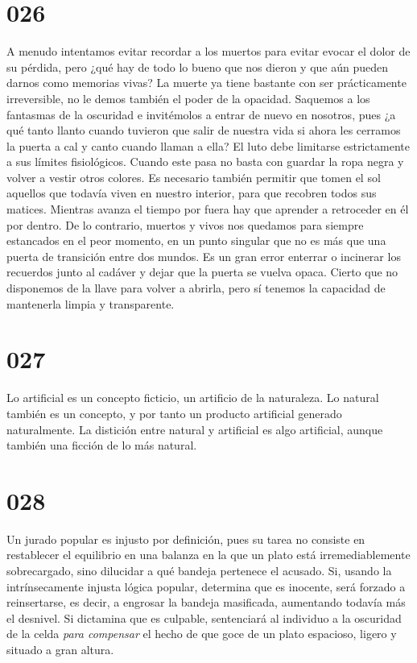 \documentclass[a4paper,11pt,openright,twocolumn]{book}
\begin{document}
\section*{026}

A menudo intentamos evitar recordar a los muertos para evitar evocar el dolor de su pérdida, pero ¿qué hay de todo lo bueno que nos dieron y que aún pueden darnos como memorias vivas? La muerte ya tiene bastante con ser prácticamente irreversible, no le demos también el poder de la opacidad. Saquemos a los fantasmas de la oscuridad e invitémolos a entrar de nuevo en nosotros, pues ¿a qué tanto llanto cuando tuvieron que salir de nuestra vida si ahora les cerramos la puerta a cal y canto cuando llaman a ella? El luto debe limitarse estrictamente a sus límites fisiológicos. Cuando este pasa no basta con guardar la ropa negra y volver a vestir otros colores. Es necesario también permitir que tomen el sol aquellos que todavía viven en nuestro interior, para que recobren todos sus matices. Mientras avanza el tiempo por fuera hay que aprender a retroceder en él por dentro. De lo contrario, muertos y vivos nos quedamos para siempre estancados en el peor momento, en un punto singular que no es más que una puerta de transición entre dos mundos. Es un gran error enterrar o incinerar los recuerdos junto al cadáver y dejar que la puerta se vuelva opaca. Cierto que no disponemos de la llave para volver a abrirla, pero sí tenemos la capacidad de mantenerla limpia y transparente.


\section*{027}

Lo artificial es un concepto ficticio, un artificio de la naturaleza. Lo natural también es un concepto, y por tanto un producto artificial generado naturalmente. La distición entre natural y artificial es algo artificial, aunque también una ficción de lo más natural.

\section*{028}

Un jurado popular es injusto por definición, pues su tarea no consiste en restablecer el equilibrio en una balanza en la que un plato está irremediablemente sobrecargado, sino dilucidar a qué bandeja pertenece el acusado. Si, usando la intrínsecamente injusta lógica popular, determina que es inocente, será forzado a reinsertarse, es decir, a engrosar la bandeja masificada, aumentando todavía más el desnivel. Si dictamina que es culpable, sentenciará al individuo a la oscuridad de la celda {\it para compensar}   el hecho de que goce de un plato espacioso, ligero y situado a gran altura.
\end{document}
